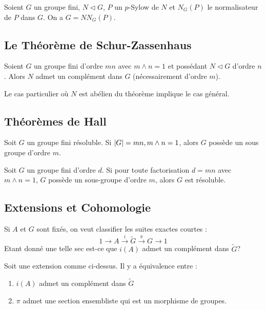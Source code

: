 \documentclass{cours}
\begin{document}
\begin{lemma}[Frattini]
    Soient $G$ un groupe fini, $N \lhd G$, $P$ un $p$-Sylow de $N$ et $N_{G}(P)$ le normalisateur de $P$ dans $G$. On a $G = N N_{G}(P)$.
\end{lemma}

\subsection{Le Théorème de Schur-Zassenhaus}
\begin{theorem}
    Soient $G$ un groupe fini d'ordre $mn$ avec $m\wedge n = 1$ et possédant $N \lhd G$ d'ordre $n$. Alors $N$ admet un complément dans $G$ (nécessairement d'ordre $m$).
\end{theorem}

\begin{lemma}
    Le cas particulier où $N$ est abélien du théorème implique le cas général.
\end{lemma}

\subsection{Théorèmes de Hall}
\begin{theorem}[P.Hall]
    Soit $G$ un groupe fini résoluble. Si $\left|G\right| = mn, m\land n = 1$, alors $G$ possède un sous groupe d'ordre $m$.
\end{theorem}

\begin{theorem}[P.Hall]
    Soit $G$ un groupe fini d'ordre $d$. Si pour toute factorisation $d = mn$ avec $m\land n = 1$, $G$ possède un sous-groupe d'ordre $m$, alors $G$ est résoluble.
\end{theorem}

\subsection{Extensions et Cohomologie}
Si $A$ et $G$ sont fixés, on veut classifier les suites exactes courtes :
\begin{equation}\label{Extension}
    1 \rightarrow A \xrightarrow{i} \tilde{G} \xrightarrow{\pi} G \rightarrow 1
\end{equation}
Etant donné une telle sec est-ce que $i(A)$ admet un complément dans $\tilde{G}$?

\begin{lemma}
    Soit une extension comme ci-dessus. Il y a équivalence entre :
    \begin{enumerate}
        \item $i(A)$ admet un complément dans $\tilde{G}$
        \item $\pi$ admet une section ensembliste qui est un morphisme de groupes.
    \end{enumerate}
\end{lemma}
\end{document}
